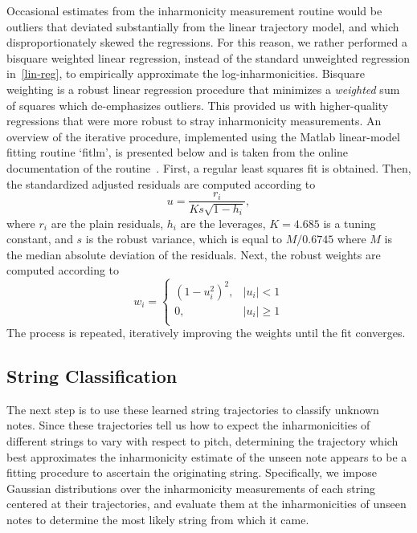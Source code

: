 \documentclass[12pt]{cmuthesis}
\begin{document}
Occasional estimates from the inharmonicity measurement routine would be outliers that deviated substantially from the linear trajectory model, and which disproportionately skewed the regressions. For this reason, we rather performed a bisquare weighted linear regression, instead of the standard unweighted regression in~\eqref{lin-reg}, to empirically approximate the log-inharmonicities. Bisquare weighting is a robust linear regression procedure that minimizes a \textit{weighted} sum of squares which de-emphasizes outliers. This provided us with higher-quality regressions that were more robust to stray inharmonicity measurements. An overview of the iterative procedure, implemented using the Matlab linear-model fitting routine `fitlm', is presented below and is taken from the online documentation of the routine~\cite{matlab-robustfit}. First, a regular least squares fit is obtained. Then, the standardized adjusted residuals are computed according to
\begin{equation}
u = \frac{r_i}{Ks\sqrt{1-h_i}},
\end{equation}
where $r_i$ are the plain residuals, $h_i$ are the leverages, $K = 4.685$ is a tuning constant, and $s$ is the robust variance, which is equal to $M/0.6745$ where $M$ is the median absolute deviation of the residuals. Next, the robust weights are computed according to
\begin{equation}
w_i = \begin{cases}
(1-u_i^2)^2, & |u_i| < 1\\
0, & |u_i| \geq 1\\
\end{cases}
\end{equation} 
The process is repeated, iteratively improving the weights until the fit converges.

\subsection{String Classification}
\label{sec:string-classification}
The next step is to use these learned string trajectories to classify unknown notes. Since these trajectories tell us how to expect the inharmonicities of different strings to vary with respect to pitch, determining the trajectory which best approximates the inharmonicity estimate of the unseen note appears to be a fitting procedure to ascertain the originating string. Specifically, we impose Gaussian distributions over the inharmonicity measurements of each string centered at their trajectories, and evaluate them at the inharmonicities of unseen notes to determine the most likely string from which it came.
\end{document}
